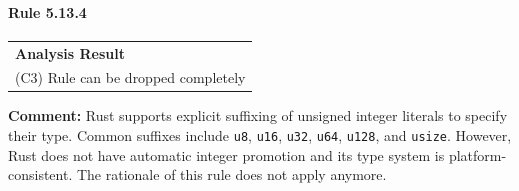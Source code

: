 \paragraph{Rule 5.13.4}
\begin{longtable}{p{13cm}}
\textbf{Analysis Result} \\
(C3) Rule can be dropped completely \\
\end{longtable}
\textbf{Comment:} Rust supports explicit suffixing of unsigned integer literals to specify their type. Common suffixes include \texttt{u8}, \texttt{u16}, \texttt{u32}, \texttt{u64}, \texttt{u128}, and \texttt{usize}. However, Rust does not have automatic integer promotion and its type system is platform-consistent. The rationale of this rule does not apply anymore. \\


